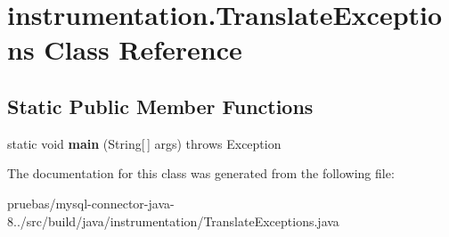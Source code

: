 \hypertarget{classinstrumentation_1_1_translate_exceptions}{}\section{instrumentation.\+Translate\+Exceptions Class Reference}
\label{classinstrumentation_1_1_translate_exceptions}
\subsection*{Static Public Member Functions}
\begin{DoxyCompactItemize}
\item 
\mbox{\label{classinstrumentation_1_1_translate_exceptions_aec586aa15e7b08000358fc1cb3de8d09}} 
static void {\bfseries main} (String\mbox{[}$\,$\mbox{]} args)  throws Exception 
\end{DoxyCompactItemize}


The documentation for this class was generated from the following file\+:\begin{DoxyCompactItemize}
\item 
pruebas/mysql-\/connector-\/java-\/8../src/build/java/instrumentation/Translate\+Exceptions.\+java\end{DoxyCompactItemize}
